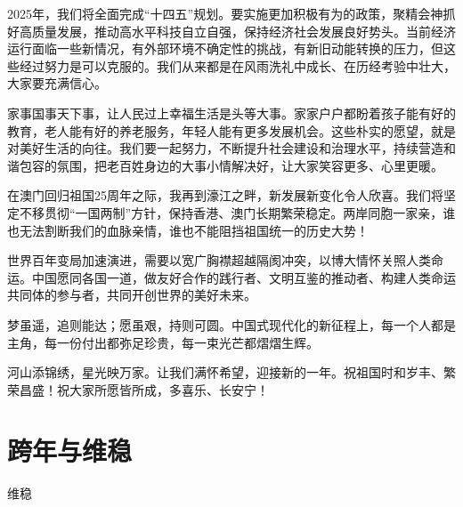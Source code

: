 2025年，我们将全面完成“十四五”规划。要实施更加积极有为的政策，聚精会神抓好高质量发展，推动高水平科技自立自强，保持经济社会发展良好势头。当前经济运行面临一些新情况，有外部环境不确定性的挑战，有新旧动能转换的压力，但这些经过努力是可以克服的。我们从来都是在风雨洗礼中成长、在历经考验中壮大，大家要充满信心。

家事国事天下事，让人民过上幸福生活是头等大事。家家户户都盼着孩子能有好的教育，老人能有好的养老服务，年轻人能有更多发展机会。这些朴实的愿望，就是对美好生活的向往。我们要一起努力，不断提升社会建设和治理水平，持续营造和谐包容的氛围，把老百姓身边的大事小情解决好，让大家笑容更多、心里更暖。

在澳门回归祖国25周年之际，我再到濠江之畔，新发展新变化令人欣喜。我们将坚定不移贯彻“一国两制”方针，保持香港、澳门长期繁荣稳定。两岸同胞一家亲，谁也无法割断我们的血脉亲情，谁也不能阻挡祖国统一的历史大势！

世界百年变局加速演进，需要以宽广胸襟超越隔阂冲突，以博大情怀关照人类命运。中国愿同各国一道，做友好合作的践行者、文明互鉴的推动者、构建人类命运共同体的参与者，共同开创世界的美好未来。

梦虽遥，追则能达；愿虽艰，持则可圆。中国式现代化的新征程上，每一个人都是主角，每一份付出都弥足珍贵，每一束光芒都熠熠生辉。

河山添锦绣，星光映万家。让我们满怀希望，迎接新的一年。祝祖国时和岁丰、繁荣昌盛！祝大家所愿皆所成，多喜乐、长安宁！

\section{跨年与维稳}
维稳